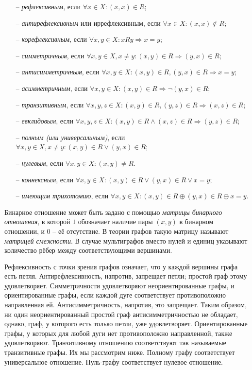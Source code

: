 \begin{itemize}
	\item[--] \emph{рефлексивным}, если $\forall x \in X \colon (x,x) \in R$;
	\item[--] \emph{антирефлексивным} или {иррефлексивным}, если $\forall x \in X \colon (x,x) \notin R$;
	\item[--] \emph{корефлексивным}, если $\forall {x,y} \in X \colon {x R y} \Rightarrow x = y$;
	\item[--] \emph{симметричным}, если $\forall x,y \in X, x \neq y \colon 
	(x,y) \in R \Rightarrow (y,x) \in R$;
	\item[--] \emph{антисимметричным}, если $\forall x,y \in X \colon (x,y) 
	\in R,(y,x) \in R \Rightarrow x = y$;
	\item[--] \emph{асимметричным}, если $\forall {x,y} \in X: (x,y) \in R \Rightarrow \lnot {(y,x) \in R}$;
	\item[--] \emph{транзитивным}, если $\forall x,y,z \in X \colon (x,y) \in 
	R, (y,z) \in R \Rightarrow (x,z) \in R$;
	\item[--] \emph{евклидовым}, если $\forall {x,y,z} \in X: (x,y) \in R \land (x,z) \in R \Rightarrow (y,z) \in R$;
	\item[--] \emph{полным (или универсальным)}, если $\forall x,y \in X, x 
	\neq y \colon (x,y) \in R \vee (y,x) \in R$;
	\item[--] \emph{нулевым}, если $\forall x,y \in X \colon (x,y) \neq R$.
	\item[--] \emph{коннексным}, если $\forall {x,y} \in X: (x,y) \in R \lor (y,x) \in R \lor x = y$;
	\item[--] \emph{имеющим трихотомию}, если $\forall {x,y} \in X: (x,y) \in R \oplus (y,x) \in R \oplus x = y$.
\end{itemize}

Бинарное отношение может быть задано с помощью \emph{матрицы бинарного отношения}, в которой $1$ обозначает наличие пары $(x,y)$ в бинарном отношении, и $0$ – её отсутствие. В теории графов такую матрицу называют \emph{матрицей смежности}. В случае мультиграфов вместо нулей и единиц указывают количество рёбер между соответствующими вершинами.

Рефлексивность с точки зрения графов означает, что у каждой вершины графа есть
петля. Антирефлексивность, напротив, запрещает петли; простой граф этому 
удовлетворяет. Симметричности удовлетворяют неориентированные графы, и 
ориентированные графы, если каждой дуге соответствует противоположно 
направленная ей. Антисимметричность, напротив, это запрещает. Таким образом,
ни один неориентированный простой граф антисимметричностью не обладает, однако,
граф, у которого есть только петли, уже удовлетворяет. Ориентированные графы, у
которых для любой дуги нет противоположно направленной, также удовлетворяют.
Транзитивному отношению соответствуют так называемые транзитивные графы. Их мы
рассмотрим ниже. Полному графу соответствует универсальное отношение. 
Нуль-графу соответствует нулевое отношение.

